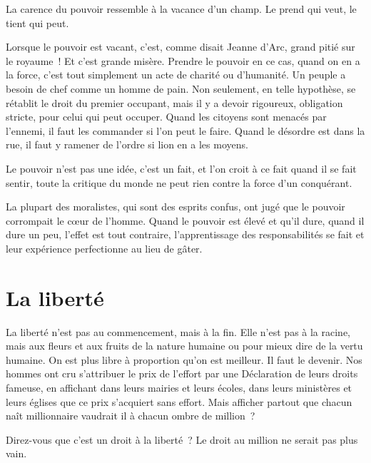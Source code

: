 \documentclass[french,twoside]{book} %
\newcommand{\astermono}{\medskip\centerline{\color{rubric}\large\selectfont{\syms ✻}}\medskip\par}%
\begin{document}
\astermono

\noindent La carence du pouvoir ressemble à la vacance d’un champ. Le prend qui veut, le tient qui peut.\par

\astermono

\noindent Lorsque le pouvoir est vacant, c’est, comme disait Jeanne d’Arc, grand pitié sur le royaume ! Et c’est grande misère. Prendre le pouvoir en ce cas, quand on en a la force, c’est tout simplement un acte de charité ou d’humanité. Un peuple a besoin de chef comme un homme de pain. Non seulement, en telle hypothèse, se rétablit le droit du premier occupant, mais il y a devoir rigoureux, obligation stricte, pour celui qui peut occuper. Quand les citoyens sont menacés par l’ennemi, il faut les commander si l’on peut le faire. Quand le désordre est dans la rue, il faut y ramener de l’ordre si lion en a les moyens.\par

\astermono

\noindent Le pouvoir n’est pas une idée, c’est un fait, et l’on croit à ce fait quand il se fait sentir, toute la critique du monde ne peut rien contre la force d’un conquérant.\par

\astermono

\noindent La plupart des moralistes, qui sont des esprits confus, ont jugé que le pouvoir corrompait le cœur de l’homme. Quand le pouvoir est élevé et qu’il dure, quand il dure un peu, l’effet est tout contraire, l’apprentissage des responsabilités se fait et leur expérience perfectionne au lieu de gâter.
\section[La liberté]{La liberté}
\noindent La liberté n’est pas au commencement, mais à la fin. Elle n’est pas à la racine, mais aux fleurs et aux fruits de la nature humaine ou pour mieux dire de la vertu humaine. On est plus libre à proportion qu’on est meilleur. Il faut le devenir. Nos hommes ont cru s’attribuer le prix de l’effort par une Déclaration de leurs droits fameuse, en affichant dans leurs mairies et leurs écoles, dans leurs ministères et leurs églises que ce prix s’acquiert sans effort. Mais afficher partout que chacun naît millionnaire vaudrait il à chacun ombre de million ?\par
Direz-vous que c’est un droit à la liberté ? Le droit au million ne serait pas plus vain.\par
\end{document}
